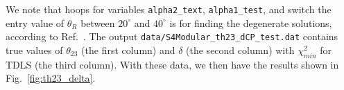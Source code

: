 \documentclass[aps,prd,nofootinbib,preprint]{revtex4}
\begin{document}
%
%
{\color{blue}We note that hoops for variables \texttt{alpha2\_text}, \texttt{alpha1\_test}, and switch the entry value of $\theta_R$ between $20^\circ$ and $40^\circ$ is for finding the degenerate solutions, according to Ref.~\cite{deMedeirosVarzielas:2019cyj}. }
The output \texttt{data/S4Modular\_th23\_dCP\_test.dat} contains true values of $\theta_{23}$ (the first column) and $\delta$ (the second column) with $\chi^2_{min}$ for TDLS (the third column). With these data, we then have the results shown in Fig.~\ref{fig:th23_delta}.
\end{document}
